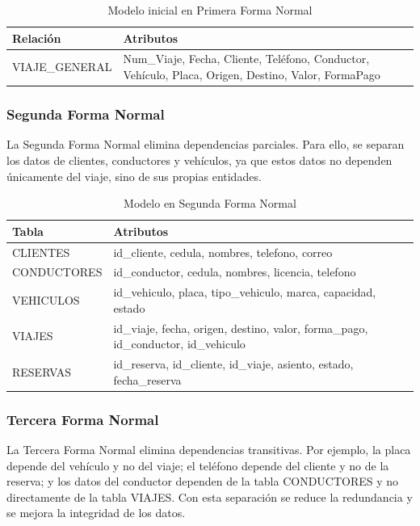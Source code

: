 \documentclass{article}
\begin{document}
\begin{table}[H]
\centering
\caption{Modelo inicial en Primera Forma Normal}
\begin{tabular}{|p{3.5cm}|p{9cm}|}
\hline
\textbf{Relación} & \textbf{Atributos} \\
\hline
VIAJE\_GENERAL & Num\_Viaje, Fecha, Cliente, Teléfono, Conductor, Vehículo, Placa, Origen, Destino, Valor, FormaPago \\
\hline
\end{tabular}
\end{table}

\subsubsection{Segunda Forma Normal}

La Segunda Forma Normal elimina dependencias parciales. Para ello, se separan los datos de clientes, conductores y vehículos, ya que estos datos no dependen únicamente del viaje, sino de sus propias entidades.

\begin{table}[H]
\centering
\caption{Modelo en Segunda Forma Normal}
\begin{tabular}{|p{3.5cm}|p{9cm}|}
\hline
\textbf{Tabla} & \textbf{Atributos} \\
\hline
CLIENTES & id\_cliente, cedula, nombres, telefono, correo \\
\hline
CONDUCTORES & id\_conductor, cedula, nombres, licencia, telefono \\
\hline
VEHICULOS & id\_vehiculo, placa, tipo\_vehiculo, marca, capacidad, estado \\
\hline
VIAJES & id\_viaje, fecha, origen, destino, valor, forma\_pago, id\_conductor, id\_vehiculo \\
\hline
RESERVAS & id\_reserva, id\_cliente, id\_viaje, asiento, estado, fecha\_reserva \\
\hline
\end{tabular}
\end{table}

\subsubsection{Tercera Forma Normal}

La Tercera Forma Normal elimina dependencias transitivas. Por ejemplo, la placa depende del vehículo y no del viaje; el teléfono depende del cliente y no de la reserva; y los datos del conductor dependen de la tabla CONDUCTORES y no directamente de la tabla VIAJES. Con esta separación se reduce la redundancia y se mejora la integridad de los datos.
\end{document}
